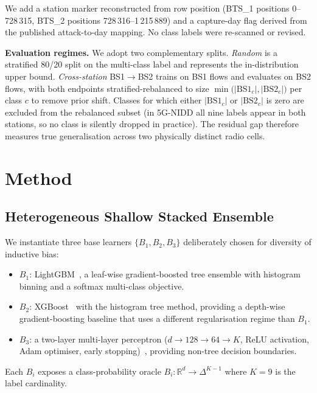 \documentclass[conference]{IEEEtran}
\begin{document}
We add a station marker reconstructed from row position (BTS\_1
positions 0--728\,315, BTS\_2 positions 728\,316--1\,215\,889) and a
capture-day flag derived from the published attack-to-day mapping. No
class labels were re-scanned or revised.

\textbf{Evaluation regimes.} We adopt two complementary splits.
\emph{Random} is a stratified 80/20 split on the multi-class label and
represents the in-distribution upper bound. \emph{Cross-station}
BS1$\rightarrow$BS2 trains on BS1 flows and evaluates on BS2 flows, with
both endpoints stratified-rebalanced to size
$\min\bigl(\lvert\text{BS1}_c\rvert, \lvert\text{BS2}_c\rvert\bigr)$ per
class $c$ to remove prior shift. Classes for which either
$\lvert\text{BS1}_c\rvert$ or $\lvert\text{BS2}_c\rvert$ is zero are
excluded from the rebalanced subset (in 5G-NIDD all nine labels appear in
both stations, so no class is silently dropped in practice). The
residual gap therefore measures true generalisation across two
physically distinct radio cells.

\section{Method}
\label{sec:method}

\subsection{Heterogeneous Shallow Stacked Ensemble}

We instantiate three base learners $\{B_1, B_2, B_3\}$ deliberately
chosen for diversity of inductive bias:
\begin{itemize}
    \item $B_1$: LightGBM~\cite{ke2017_lightgbm}, a leaf-wise
        gradient-boosted tree ensemble with histogram binning and a
        softmax multi-class objective.
    \item $B_2$: XGBoost~\cite{chen2016_xgboost} with the histogram
        tree method, providing a depth-wise gradient-boosting baseline
        that uses a different regularisation regime than $B_1$.
    \item $B_3$: a two-layer multi-layer perceptron
        ($d \to 128 \to 64 \to K$, ReLU activation, Adam optimiser,
        early stopping)~\cite{pedregosa2011_sklearn}, providing
        non-tree decision boundaries.
\end{itemize}
Each $B_i$ exposes a class-probability oracle
$B_i: \mathbb{R}^d \to \Delta^{K-1}$ where $K=9$ is the label cardinality.
\end{document}
